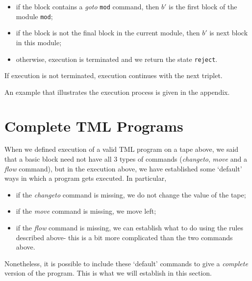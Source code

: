 \begin{itemize}
\begin{itemize}
\begin{itemize}
            \item if the block contains a \textit{goto} \texttt{mod} command, then $b'$ is the first block of the module \texttt{mod};
            \item if the block is not the final block in the current module, then $b'$ is next block in this module;
            \item otherwise, execution is terminated and we return the state \texttt{reject}.
        \end{itemize}
    \end{itemize}
    If execution is not terminated, execution continues with the next triplet.
\end{itemize}
An example that illustrates the execution process is given in the appendix.

\section{Complete TML Programs}
When we defined execution of a valid TML program on a tape above, we said that a basic block need not have all 3 types of commands (\textit{changeto}, \textit{move} and a \textit{flow} command), but in the execution above, we have established some `default' ways in which a program gets executed. In particular,
\begin{itemize}
    \item if the \textit{changeto} command is missing, we do not change the value of the tape;
    \item if the \textit{move} command is missing, we move left;
    \item if the \textit{flow} command is missing, we can establish what to do using the rules described above- this is a bit more complicated than the two commands above.
\end{itemize}
Nonetheless, it is possible to include these `default' commands to give a \emph{complete} version of the program. This is what we will establish in this section. 

